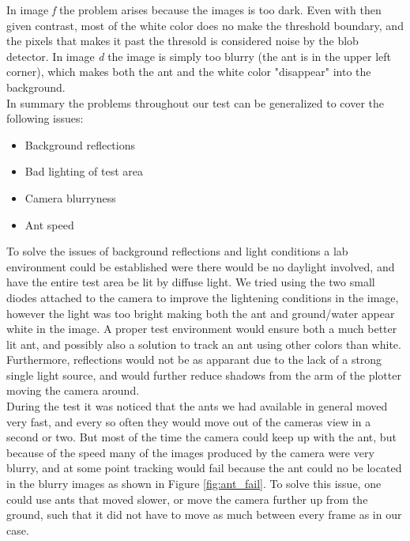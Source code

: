 In image \emph{f} the problem arises because the images is too dark. Even with then given contrast, most of the white color does no make the threshold boundary, and the pixels that makes it past the thresold is considered noise by the blob detector. In image \emph{d} the image is simply too blurry (the ant is in the upper left corner), which makes both the ant and the white color "disappear" into the background.\\

In summary the problems throughout our test can be generalized to cover the following issues:

\begin{itemize}
    \item Background reflections
    \item Bad lighting of test area
    \item Camera blurryness
    \item Ant speed
\end{itemize}

To solve the issues of background reflections and light conditions a lab environment could be established were there would be no daylight involved, and have the entire test area be lit by diffuse light. We tried using the two small diodes attached to the camera to improve the lightening conditions in the image, however the light was too bright making both the ant and ground/water appear white in the image. A proper test environment would ensure both a much better lit ant, and possibly also a solution to track an ant using other colors than white. Furthermore, reflections would not be as apparant due to the lack of a strong single light source, and would further reduce shadows from the arm of the plotter moving the camera around.\\

During the test it was noticed that the ants we had available in general moved very fast, and every so often they would move out of the cameras view in a second or two. But most of the time the camera could keep up with the ant, but because of the speed many of the images produced by the camera were very blurry, and at some point tracking would fail because the ant could no be located in the blurry images as shown in Figure \ref{fig:ant_fail}. To solve this issue, one could use ants that moved slower, or move the camera further up from the ground, such that it did not have to move as much between every frame as in our case. \\

